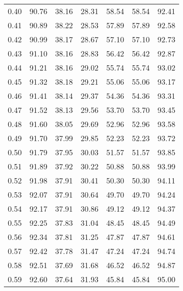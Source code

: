 \begin{tabular}{|c|c|c|c|c|c|c|}
      0.40 &     90.76 &     38.16 &      28.31 &   58.54 &      58.54 &         92.41 \\
      0.41 &     90.89 &     38.22 &      28.53 &   57.89 &      57.89 &         92.58 \\
      0.42 &     90.99 &     38.17 &      28.67 &   57.10 &      57.10 &         92.73 \\
      0.43 &     91.10 &     38.16 &      28.83 &   56.42 &      56.42 &         92.87 \\
      0.44 &     91.21 &     38.16 &      29.02 &   55.74 &      55.74 &         93.02 \\
      0.45 &     91.32 &     38.18 &      29.21 &   55.06 &      55.06 &         93.17 \\
      0.46 &     91.41 &     38.14 &      29.37 &   54.36 &      54.36 &         93.31 \\
      0.47 &     91.52 &     38.13 &      29.56 &   53.70 &      53.70 &         93.45 \\
      0.48 &     91.60 &     38.05 &      29.69 &   52.96 &      52.96 &         93.58 \\
      0.49 &     91.70 &     37.99 &      29.85 &   52.23 &      52.23 &         93.72 \\
      0.50 &     91.79 &     37.95 &      30.03 &   51.57 &      51.57 &         93.85 \\
      0.51 &     91.89 &     37.92 &      30.22 &   50.88 &      50.88 &         93.99 \\
      0.52 &     91.98 &     37.91 &      30.41 &   50.30 &      50.30 &         94.11 \\
      0.53 &     92.07 &     37.91 &      30.64 &   49.70 &      49.70 &         94.24 \\
      0.54 &     92.17 &     37.91 &      30.86 &   49.12 &      49.12 &         94.37 \\
      0.55 &     92.25 &     37.83 &      31.04 &   48.45 &      48.45 &         94.49 \\
      0.56 &     92.34 &     37.81 &      31.25 &   47.87 &      47.87 &         94.61 \\
      0.57 &     92.42 &     37.78 &      31.47 &   47.24 &      47.24 &         94.74 \\
      0.58 &     92.51 &     37.69 &      31.68 &   46.52 &      46.52 &         94.87 \\
      0.59 &     92.60 &     37.64 &      31.93 &   45.84 &      45.84 &         95.00 \\

\end{tabular}
